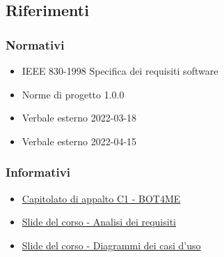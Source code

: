\subsection{Riferimenti}

\subsubsection{Normativi}
\begin{itemize}
    \item IEEE 830-1998 Specifica dei requisiti software
    \item Norme di progetto 1.0.0
    \item Verbale esterno 2022-03-18
    \item Verbale esterno 2022-04-15
\end{itemize}

\subsubsection{Informativi}
\begin{itemize}
    \item \href{https://www.math.unipd.it/~tullio/IS-1/2021/Progetto/C1.pdf}{\color{blue} Capitolato di appalto C1 - BOT4ME}
    \item \href{https://www.math.unipd.it/~tullio/IS-1/2021/Dispense/T07.pdf}{\color{blue} Slide del corso - Analisi dei requisiti}
    \item \href{https://www.math.unipd.it/~rcardin/swea/2022/Diagrammi%20Use%20Case.pdf}{\color{blue} Slide del corso - Diagrammi dei casi d'uso}
\end{itemize}
\newpage